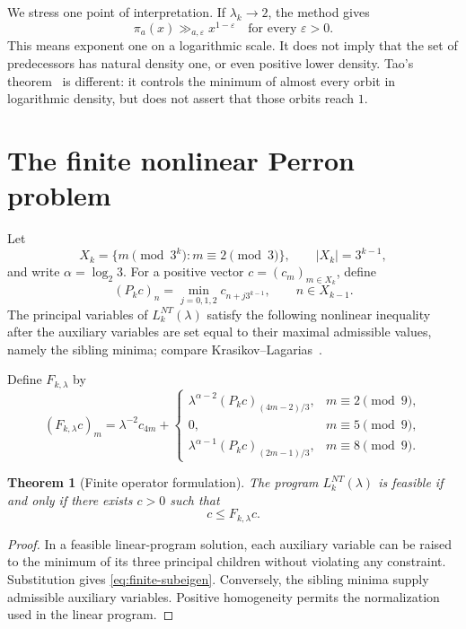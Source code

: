 \documentclass[11pt]{amsart}
\numberwithin{equation}{section}
\newtheorem{theorem}{Theorem}[section]
\newcommand{\eps}{\varepsilon}
\begin{document}
We stress one point of interpretation.  If $\lambda_k\to2$, the method gives
\[
\pi_a(x)\gg_{a,\eps}x^{1-\eps}
\quad\text{for every }\eps>0.
\]
This means exponent one on a logarithmic scale.  It does not imply that the set of predecessors has natural density one, or even positive lower density.  Tao's theorem~\cite{Tao2022} is different: it controls the minimum of almost every orbit in logarithmic density, but does not assert that those orbits reach $1$.

\section{The finite nonlinear Perron problem}\label{sec:finite-PF}

Let
\[
X_k=\{m\pmod{3^k}:m\equiv2\pmod3\},
\qquad |X_k|=3^{k-1},
\]
and write $\alpha=\log_2 3$.  For a positive vector $c=(c_m)_{m\in X_k}$, define
\begin{equation}\label{eq:Pk}
(P_kc)_n=
\min_{j=0,1,2}c_{n+j3^{k-1}},
\qquad n\in X_{k-1}.
\end{equation}
The principal variables of $L_k^{NT}(\lambda)$ satisfy the following nonlinear inequality after the auxiliary variables are set equal to their maximal admissible values, namely the sibling minima; compare Krasikov--Lagarias~\cite[equations (2.3)--(2.6)]{KrasikovLagarias2003}.

Define $F_{k,\lambda}$ by
\begin{equation}\label{eq:Fklambda}
(F_{k,\lambda}c)_m
=
\lambda^{-2}c_{4m}
+
\begin{cases}
\lambda^{\alpha-2}(P_kc)_{(4m-2)/3},&m\equiv2\pmod9,\\
0,&m\equiv5\pmod9,\\
\lambda^{\alpha-1}(P_kc)_{(2m-1)/3},&m\equiv8\pmod9.
\end{cases}
\end{equation}

\begin{theorem}[Finite operator formulation]\label{thm:finite-operator}
The program $L_k^{NT}(\lambda)$ is feasible if and only if there exists $c>0$ such that
\begin{equation}\label{eq:finite-subeigen}
c\le F_{k,\lambda}c.
\end{equation}
\end{theorem}

\begin{proof}
In a feasible linear-program solution, each auxiliary variable can be raised to the minimum of its three principal children without violating any constraint.  Substitution gives \eqref{eq:finite-subeigen}.  Conversely, the sibling minima supply admissible auxiliary variables.  Positive homogeneity permits the normalization used in the linear program.
\end{proof}
\end{document}
